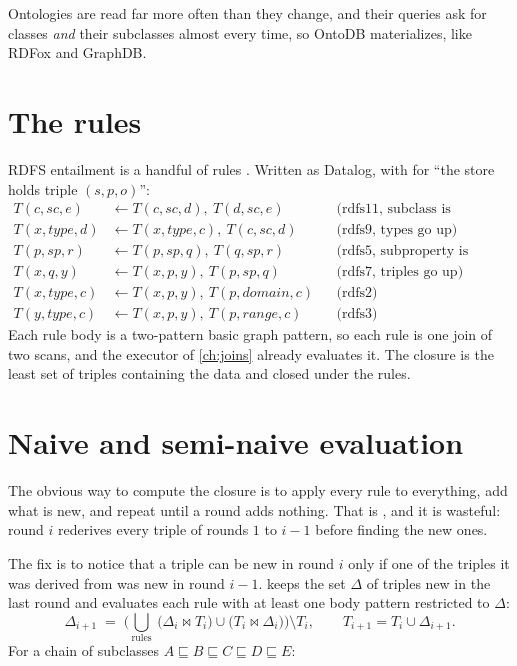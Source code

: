 Ontologies are read far more often than they change, and their queries ask
for classes \emph{and} their subclasses almost every time, so OntoDB
materializes, like RDFox and GraphDB.

\section{The rules}

RDFS entailment is a handful of rules \cite{rdfsemantics}. Written as Datalog,
with  for ``the store holds triple $(s,p,o)$'':
\begin{align*}
T(c, \mathit{sc}, e) &\leftarrow T(c, \mathit{sc}, d),\ T(d, \mathit{sc}, e) && \text{(rdfs11, subclass is transitive)}\\
T(x, \mathit{type}, d) &\leftarrow T(x, \mathit{type}, c),\ T(c, \mathit{sc}, d) && \text{(rdfs9, types go up)}\\
T(p, \mathit{sp}, r) &\leftarrow T(p, \mathit{sp}, q),\ T(q, \mathit{sp}, r) && \text{(rdfs5, subproperty is transitive)}\\
T(x, q, y) &\leftarrow T(x, p, y),\ T(p, \mathit{sp}, q) && \text{(rdfs7, triples go up)}\\
T(x, \mathit{type}, c) &\leftarrow T(x, p, y),\ T(p, \mathit{domain}, c) && \text{(rdfs2)}\\
T(y, \mathit{type}, c) &\leftarrow T(x, p, y),\ T(p, \mathit{range}, c) && \text{(rdfs3)}
\end{align*}
Each rule body is a two-pattern basic graph pattern, so each rule is one join
of two scans, and the executor of \cref{ch:joins} already evaluates it. The
closure is the least set of triples containing the data and closed under the
rules.

\section{Naive and semi-naive evaluation}

The obvious way to compute the closure is to apply every rule to everything,
add what is new, and repeat until a round adds nothing. That is
, and it is wasteful: round $i$ rederives every triple of
rounds $1$ to $i-1$ before finding the new ones.

The fix is to notice that a triple can be new in round $i$ only if one of the
triples it was derived from was new in round $i-1$.  \cite{alicebook} keeps the set $\Delta$ of triples new in the last
round and evaluates each rule with at least one body pattern restricted to
$\Delta$:
\[
\Delta_{i+1} \;=\; \Big(\textstyle\bigcup_{\text{rules}}\ \big(\Delta_i \Join T_i\big) \cup \big(T_i \Join \Delta_i\big)\Big) \setminus T_i,
\qquad T_{i+1} = T_i \cup \Delta_{i+1}.
\]
For a chain of subclasses $A \sqsubseteq B \sqsubseteq C \sqsubseteq D \sqsubseteq E$:


